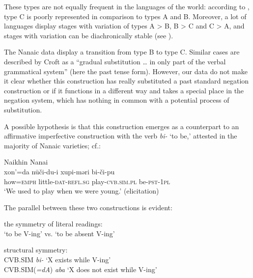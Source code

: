 \documentclass[output=paper]{langscibook}
\begin{document}

These types are not equally frequent in the languages of the world: according to \citet[147]{Veselinova2016}, type C is poorly represented in comparison to types A and B. Moreover, a lot of languages display stages with variation of types A > B, B > C and C > A, and stages with variation can be diachronically stable (see \citealp[158]{Veselinova2016}).

The Nanaic data display a transition from type B to type C. Similar cases are described by Croft as a ``gradual substitution … in only part of the verbal grammatical system” \citeyearpar[10]{Croft1991} (here the past tense form). However, our data do not make it clear whether this construction has really substituted a past standard negation construction or if it functions in a different way and takes a special place in the negation system, which has nothing in common with a potential process of substitution.

A possible hypothesis is that this construction emerges as a counterpart to an affirmative imperfective construction with the verb \textit{bi-} ‘to be,’ attested in the majority of Nanaic varieties; cf.:

\ea Naikhin Nanai \label{ex:T18}\\
	\gll xon’=da	nūči-du-i	xupi-məri	bi-či-pu\\
	how=\textsc{emph}	little-\textsc{dat-refl.sg}	play-\textsc{cvb.sim.pl}	be-\textsc{pst-1pl}\\
	\glt `We used to play when we were young.' (elicitation)
\z

The parallel between these two constructions is evident:

\begin{exe}\label{ex:T19}
    \ex the symmetry of literal readings:\\
    `to be V-ing' vs. `to be absent V-ing' 
\end{exe}

\begin{exe}\label{ex:T20}
    \ex structural symmetry:\\
    CVB.SIM \textit{bi-} `X exists while V-ing'\\
    CVB.SIM(\textit{=dA}) \textit{aba} `X does not exist while V-ing'
\end{exe}
\end{document}
